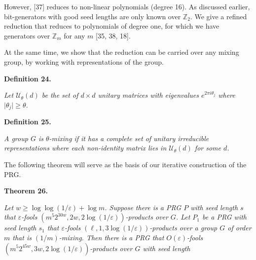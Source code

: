 However, [37] reduces to non-linear polynomials (degree 16). As discussed earlier, bit-generators with good seed lengths are only known over $\mathbb{Z}_{2}$. We give a refined reduction that reduces to polynomials of degree one, for which we have generators over $\mathbb{Z}_{m}$ for any $m$ [35, 38, 18].\par




At the same time, we show that the reduction can be carried over any mixing group, by working with representations of the group.\par





\par\medskip\noindent\textbf{
\textbf{Definition 24}\textbf{.}
}\par



\emph{Let $\mathcal{U}_{\theta}(d)$ be the set of $d\times d$ unitary matrices with eigenvalues $e^{2\pi i\theta_{j}}$ where $\lvert\theta_{j}\rvert\geq\theta$.}\par







\par\medskip\noindent\textbf{
\textbf{Definition 25}\textbf{.}
}\par



\emph{A group $G$ is $\theta$-mixing if it has a complete set of unitary
irreducible representations where each non-identity matrix lies in $\mathcal{U}_{\theta}(d)$ for some $d$.}\par






The following theorem will serve as the basis of our iterative construction of the PRG.\par





\par\medskip\noindent\textbf{
\textbf{Theorem 26}\textbf{.}
}\par



\emph{Let $w\geq\log\log(1/\varepsilon)+\log m$.
Suppose there is a PRG $P$ with seed length $s$ that $\varepsilon$-fools $(m^{5}2^{30w},2w,2\log(1/\varepsilon))$-products over $G$.
Let $P_{1}$ be a PRG with seed length $s_{1}$ that $\varepsilon$-fools $(\ell,1,3\log(1/\varepsilon))$-products over a group $G$ of order $m$ that is $(1/m)$-mixing.
Then there is a PRG that $O(\varepsilon)$-fools $(m^{5}2^{45w},3w,2\log(1/\varepsilon))$-products over $G$ with seed length}\par


